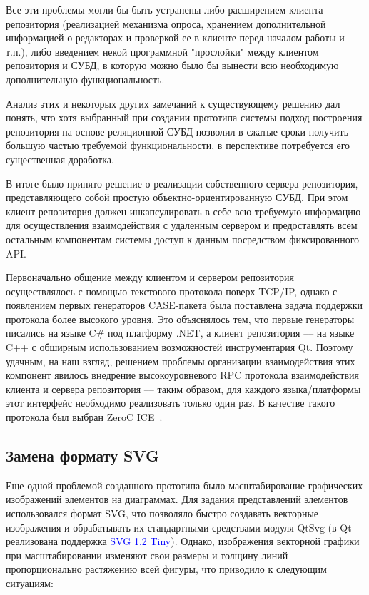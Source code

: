 \documentclass[a5paper]{article}
\newcommand\textstyleInternetlink[1]{\textcolor{blue}{#1}}
\begin{document}
Все эти проблемы могли бы быть устранены либо расширением клиента
репозитория (реализацией механизма опроса, хранением дополнительной
информацией о редакторах и проверкой ее в клиенте перед началом работы
и т.п.), либо введением некой программной "прослойки" между клиентом
репозитория и СУБД, в которую можно было бы вынести всю необходимую
дополнительную функциональность.

Анализ этих и некоторых других замечаний к существующему решению дал
понять, что хотя выбранный при создании прототипа системы подход
построения репозитория на основе реляционной СУБД позволил в сжатые
сроки получить большую частью требуемой функциональности, в перспективе
потребуется его существенная доработка. 

В итоге было принято решение о реализации собственного сервера
репозитория, представляющего собой простую объектно-ориентированную
СУБД. При этом клиент репозитория должен инкапсулировать в себе всю
требуемую информацию для осуществления взаимодействия с удаленным
сервером и предоставлять всем остальным компонентам системы доступ к
данным посредством фиксированного API. 

Первоначально общение между клиентом и сервером репозитория
осуществлялось с помощью текстового протокола поверх
TCP/IP, однако с появлением первых генераторов CASE-пакета
была поставлена задача поддержки протокола более высокого уровня. Это
объяснялось тем, что первые генераторы писались на языке
C\# под платформу .NET, а клиент репозитория --– на языке
C++ с обширным использованием возможностей
инструментария Qt. Поэтому удачным, на наш
взгляд, решением проблемы организации взаимодействия этих компонент
явилось внедрение высокоуровневого RPC
протокола взаимодействия клиента и сервера репозитория --– таким образом,
для каждого языка/платформы этот интерфейс необходимо реализовать
только один раз. В качестве такого протокола был выбран
ZeroC ICE~\cite{ice}.

\subsection{Замена формату SVG}

Еще одной проблемой созданного прототипа было масштабирование
графических изображений элементов на диаграммах. Для задания
представлений элементов использовался формат SVG, что позволяло быстро
создавать векторные изображения и обрабатывать их стандартными
средствами модуля QtSvg (в Qt реализована поддержка
\href{http://www.w3.org/TR/SVGMobile12/}{\textstyleInternetlink{SVG 1.2 Tiny}}). 
Однако, изображения векторной графики при масштабировании
изменяют свои размеры и толщину линий пропорционально растяжению всей
фигуры, что приводило к следующим ситуациям:
\end{document}
